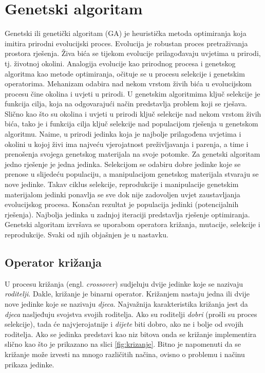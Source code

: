 \documentclass[times, utf8, zavrsni]{fer}
\begin{document}
\section{Genetski algoritam}
\label{sec:genetski}
Genetski ili genetički algoritam (GA)  je heuristička metoda optimiranja koja imitira prirodni evolucijski proces. Evolucija je robustan proces pretraživanja prostora rješenja. Živa bića se tijekom evolucije prilagođavaju uvjetima u prirodi, tj. životnoj okolini. Analogija evolucije kao prirodnog procesa i genetskog algoritma kao metode optimiranja, očituje se u procesu selekcije i genetskim operatorima. Mehanizam odabira nad nekom vrstom živih bića u evolucijskom procesu čine okolina i uvjeti u prirodi. U genetskim algoritmima ključ selekcije je funkcija cilja, koja na odgovarajući način predstavlja problem koji se rješava. Slično kao što su okolina i uvjeti u prirodi ključ selekcije nad nekom vrstom živih bića, tako je i funkcija cilja ključ selekcije nad populacijom rješenja u genetskom algoritmu. Naime, u prirodi jedinka koja je najbolje prilagođena uvjetima i okolini u kojoj živi ima najveću vjerojatnost preživljavanja i parenja, a time i prenošenja svojega genetskog materijala na svoje potomke. Za genetski algoritam jedno rješenje je jedna jedinka. Selekcijom se odabiru dobre jedinke koje se prenose u slijedeću populaciju, a manipulacijom genetskog materijala stvaraju se nove jedinke. Takav ciklus selekcije, reprodukcije i manipulacije genetskim materijalom jedinki ponavlja se sve dok nije zadovoljen uvjet zaustavljanja evolucijskog procesa. Konačan rezultat je populacija jedinki (potencijalnih rješenja). Najbolja jedinka u zadnjoj iteraciji predstavlja rješenje optimiranja. Genetski algoritam izvršava se uporabom operatora križanja, mutacije, selekcije i reprodukcije. Svaki od njih objašnjen je u nastavku.

\subsection{Operator križanja}
U procesu križanja (engl. \emph{crossover}) sudjeluju dvije jedinke koje se nazivaju \emph{roditelji}. Dakle, križanje je binarni operator. Križanjem nastaju jedna ili dvije nove jedinke koje se nazivaju \emph{djeca}. Najvažnija karakteristika križanja jest da \emph{djeca} nasljeđuju svojstva svojih roditelja. Ako su roditelji \emph{dobri} (prošli su proces selekcije), tada će najvjerojatnije i \emph{dijete} biti dobro, ako ne i bolje od svojih roditelja. Ako se jedinka predstavi kao niz bitova onda se križanje implementira slično kao što je prikazano na slici \ref{fig:krizanje}. Bitno je napomenuti da se križanje može izvesti na mnogo različitih načina, ovisno o problemu i načinu prikaza jedinke.
\end{document}
